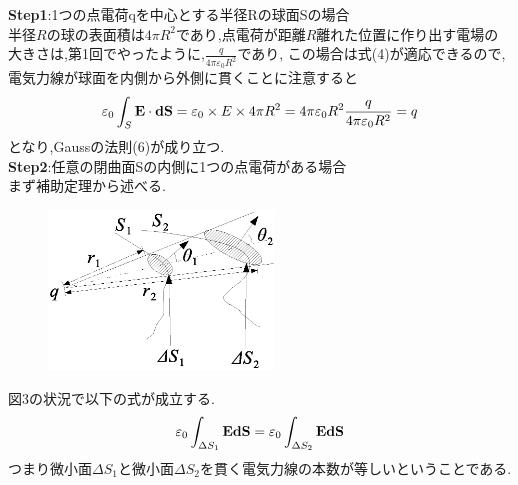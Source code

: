 \documentclass[../main]{subfiles}
\begin{document}
\noindent
{\bf Step1}:1つの点電荷qを中心とする半径Rの球面Sの場合 \\
半径$R$の球の表面積は$4 \pi R^{2}$であり,点電荷が距離$R$離れた位置に作り出す電場の大きさは,第1回でやったように,$\frac{q}{4\pi \varepsilon_0 R^2}$であり,
この場合は式(4)が適応できるので,電気力線が球面を内側から外側に貫くことに注意すると
\begin{equation}
\varepsilon_0 \int_{S}^{} {\bf E} \cdot {\bf dS}=\varepsilon_0 \times E \times 4\pi R^2 = 4 \pi \varepsilon_0 R^2 \frac{q}{4\pi \varepsilon_0 R^2}=q
\end{equation}
となり,Gaussの法則(6)が成り立つ.\\

\noindent
{\bf Step2}:任意の閉曲面Sの内側に1つの点電荷がある場合 \\
まず補助定理から述べる.
\begin{figure}[htbp]
 \begin{center}
  \includegraphics[width=60mm]{2.3.eps}
 \end{center}
 \caption{}
 \label{fig:one}
\end{figure}
図3の状況で以下の式が成立する.
\begin{equation}
\varepsilon_0 \int_{\Delta S_1}^{}{\bf E}{\bf dS} =\varepsilon_0 \int_{\Delta S_2}^{}{\bf E}{\bf dS}
\end{equation}
つまり微小面$\Delta S_1$と微小面$\Delta S_2$を貫く電気力線の本数が等しいということである.\\
\end{document}
